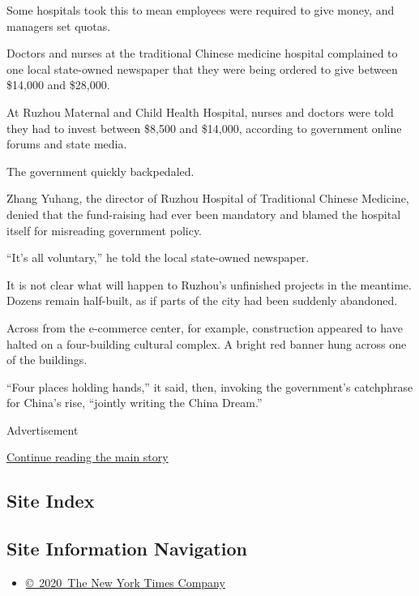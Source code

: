 Some hospitals took this to mean employees were required to give money,
and managers set quotas.

Doctors and nurses at the traditional Chinese medicine hospital
complained to one local state-owned newspaper that they were being
ordered to give between \$14,000 and \$28,000.

At Ruzhou Maternal and Child Health Hospital, nurses and doctors were
told they had to invest between \$8,500 and \$14,000, according to
government online forums and state media.

The government quickly backpedaled.

Zhang Yuhang, the director of Ruzhou Hospital of Traditional Chinese
Medicine, denied that the fund-raising had ever been mandatory and
blamed the hospital itself for misreading government policy.

``It's all voluntary,'' he told the local state-owned newspaper.

It is not clear what will happen to Ruzhou's unfinished projects in the
meantime. Dozens remain half-built, as if parts of the city had been
suddenly abandoned.

Across from the e-commerce center, for example, construction appeared to
have halted on a four-building cultural complex. A bright red banner
hung across one of the buildings.

``Four places holding hands,'' it said, then, invoking the government's
catchphrase for China's rise, ``jointly writing the China Dream.''

Advertisement

\protect\hyperlink{after-bottom}{Continue reading the main story}

\hypertarget{site-index}{%
\subsection{Site Index}\label{site-index}}

\hypertarget{site-information-navigation}{%
\subsection{Site Information
Navigation}\label{site-information-navigation}}

\begin{itemize}
\tightlist
\item
  \href{https://help.nytimes.com/hc/en-us/articles/115014792127-Copyright-notice}{©~2020~The
  New York Times Company}
\end{itemize}

